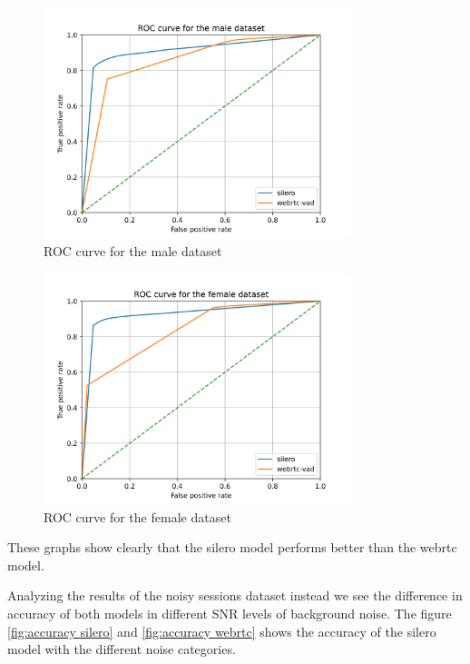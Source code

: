 \documentclass[../main.tex]{subfiles}
\begin{document}
\begin{figure}[ht]
    \centering
    \includegraphics[width=0.8\textwidth]{images/ROC curve for the male dataset.png}
    \caption{ROC curve for the male dataset}
    \label{fig:roc male}
\end{figure}

\begin{figure}[ht]
    \centering
    \includegraphics[width=0.8\textwidth]{images/ROC curve for the female dataset.png}
    \caption{ROC curve for the female dataset}
    \label{fig:roc female}
\end{figure}

These graphs show clearly that the silero model performs better than the webrtc model. 

Analyzing the results of the noisy sessions dataset instead we see the difference in accuracy of both models in different SNR levels of background noise. The figure \ref{fig:accuracy silero} and \ref{fig:accuracy webrtc} shows the accuracy of the silero model with the different noise categories.
\end{document}

